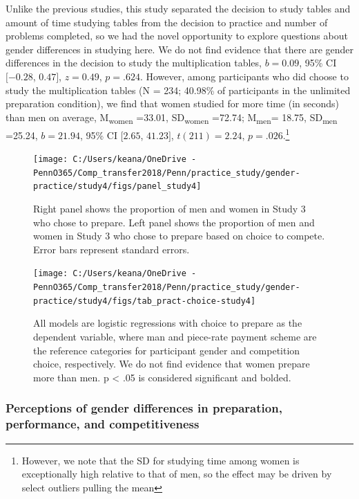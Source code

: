 \documentclass[a4paper, nobind]{templates/ociamthesis}
\begin{document}
Unlike the previous studies, this study separated the decision to study tables and amount of time studying tables from the decision to practice and number of problems completed, so we had the novel opportunity to explore questions about gender differences in studying here. We do not find evidence that there are gender differences in the decision to study the multiplication tables, \(b = 0.09\), 95\% CI \([-0.28\), \(0.47]\), \(z = 0.49\), \(p = .624\). However, among participants who did choose to study the multiplication tables (N = 234; 40.98\% of participants in the unlimited preparation condition), we find that women studied for more time (in seconds) than men on average, M\textsubscript{women} =33.01, SD\textsubscript{women} =72.74; M\textsubscript{men}= 18.75, SD\textsubscript{men} =25.24, \(b = 21.94\), 95\% CI \([2.65\), \(41.23]\), \(t(211) = 2.24\), \(p = .026\).\footnote{However, we note that the SD for studying time among women is exceptionally high relative to that of men, so the effect may be driven by select outliers pulling the mean}

\begin{figure}

{\centering \texttt{[image: C:/Users/keana/OneDrive - PennO365/Comp\_transfer2018/Penn/practice\_study/gender-practice/study4/figs/panel\_study4]} 

}

\caption{Right panel shows the proportion of men and women in Study 3 who chose to prepare. Left panel shows the proportion of men and women in Study 3 who chose to prepare based on choice to compete. Error bars represent standard errors.}\label{fig:panel-study4}
\end{figure}

\begin{figure}

{\centering \texttt{[image: C:/Users/keana/OneDrive - PennO365/Comp\_transfer2018/Penn/practice\_study/gender-practice/study4/figs/tab\_pract-choice-study4]} 

}

\caption{All models are logistic regressions with choice to prepare as the dependent variable, where man and piece-rate payment scheme are the reference categories for participant gender and competition choice, respectively. We do not find evidence that women prepare more than men. p < .05 is considered significant and bolded.}\label{fig:tab-pract-choice-study4}
\end{figure}

\hypertarget{perceptions-of-gender-differences-in-preparation-performance-and-competitiveness-3}{%
\subsubsection{Perceptions of gender differences in preparation, performance, and competitiveness}\label{perceptions-of-gender-differences-in-preparation-performance-and-competitiveness-3}}
\end{document}
